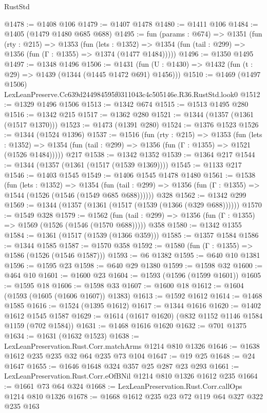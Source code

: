 \begin{lexlean}{RustStd}
\begin{coremodule}
@1478 := @1408 @106
@1479 := @1407 @1478
@1480 := @1411 @106
@1484 := @1405 (@1479 @1480 @685 @688)
@1495 := fun (params : @674) =>
  @1351
    (fun (rty : @215) =>
    @1353
      (fun (lets : @1352) =>
      @1354 (fun (tail : @299) => @1356 (fun (Γ : @1355) => @1374 (@1477 @1484)))))
@1496 := @1350 @1495
@1497 := @1348 @1496
@1506 := @1431 (fun (U : @1430) => @1432 (fun (t : @29) => @1439 (@1344 (@1445 @1472 @691) @1456)))
@1510 := @1469 (@1497 @1506) LexLeanPreserve.Cc639d244984595f0311043c4c505146e.R36.RustStd.look0
@1512 := @1329 @1496 @1506
@1513 := @1342 @674
@1515 := @1513 @1495 @280
@1516 := @1342 @215
@1517 := @1362 @280
@1521 := @1344 (@1357 (@1361 (@1517 @1370)))
@1523 := @1473 (@1391 @280)
@1524 := @1376 @1523
@1526 := @1344 (@1524 @1396)
@1537 := @1516
    (fun (rty : @215) =>
    @1353
      (fun (lets : @1352) =>
      @1354 (fun (tail : @299) => @1356 (fun (Γ : @1355) => @1521 (@1526 @1484)))))
    @217
@1538 := @1342 @1352
@1539 := @1364 @217
@1544 := @1344 (@1357 (@1361 (@1517 (@1539 @1369))))
@1545 := @1133 @217
@1546 := @1403 @1545
@1549 := @1406 @1545 @1478 @1480
@1561 := @1538
    (fun (lets : @1352) =>
    @1354 (fun (tail : @299) => @1356 (fun (Γ : @1355) => @1544 (@1526 (@1546 (@1549 @685 @688))))))
    @328
@1562 := @1342 @299
@1569 := @1344 (@1357 (@1361 (@1517 (@1539 (@1366 (@329 @688))))))
@1570 := @1549 @328
@1579 := @1562
    (fun (tail : @299) => @1356 (fun (Γ : @1355) => @1569 (@1526 (@1546 (@1570 @688)))))
    @358
@1580 := @1342 @1355
@1584 := @1361 (@1517 (@1539 (@1366 @359)))
@1585 := @1357 @1584
@1586 := @1344 @1585
@1587 := @1570 @358
@1592 := @1580 (fun (Γ : @1355) => @1586 (@1526 (@1546 @1587)))
@1593 := @6 @1382
@1595 := @640 @10 @1381
@1596 := @1595 @23
@1598 := @640 @29 @1380
@1599 := @1598 @32
@1600 := @464 @10
@1601 := @1600 @23
@1604 := @1593 (@1596 (@1599 @1601))
@1605 := @1595 @18
@1606 := @1598 @33
@1607 := @1600 @18
@1612 := @1604 (@1593 (@1605 (@1606 @1607)) @1383)
@1613 := @1592 @1612
@1614 := @1468 @1585
@1616 := @1524 (@1395 @1612)
@1617 := @1344 @1616
@1620 := @1402 @1612 @1545 @1587
@1629 := @1614 (@1617 @1620) (@832 @1152 @1146 @1584 @1159 (@702 @1584))
@1631 := @1468 @1616 @1620
@1632 := @701 @1375
@1634 := @1631 (@1632 @1523)
@1638 := LexLeanPreservation.Rust.Corr.matchArms @1214 @810 @1326
@1646 := @1638 @1612 @235 @235 @32 @64 @235 @73 @104
@1647 := @19 @25
@1648 := @24 @1647
@1655 := @1646 @1648 @324 @357 @25 @287 @23 @293
@1661 := LexLeanPreservation.Rust.Corr.eOfBNil @1214 @810 @1326 @1612 @235
@1664 := @1661 @73 @64 @324
@1668 := LexLeanPreservation.Rust.Corr.callOps @1214 @810 @1326
@1678 := @1668 @1612 @235 @23 @72 @119 @64 @327 @322 @235 @163

\end{coremodule}
\end{lexlean}
